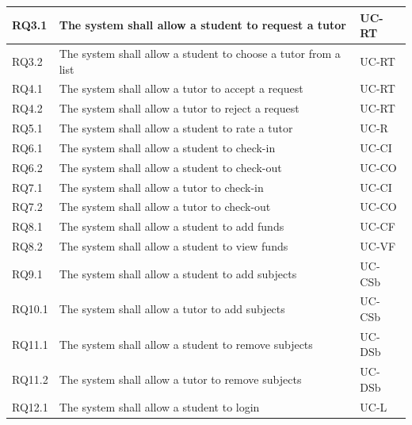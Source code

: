 \documentclass[12pt]{article}
\begin{document}
{\begin{longtable}{| l | p{10cm}| l |}
				RQ3.1 & The system shall allow a student to request a tutor & UC-RT \\ \hline
				RQ3.2 & The system shall allow a student to choose a tutor from a list & UC-RT \\ \hline

				RQ4.1 & The system shall allow a tutor to accept a request & UC-RT \\ \hline
				RQ4.2 & The system shall allow a tutor to reject a request & UC-RT \\ \hline




				RQ5.1 & The system shall allow a student to rate a tutor & UC-R\\ \hline

				RQ6.1 & The system shall allow a student to check-in  & UC-CI \\ \hline
				RQ6.2 & The system shall allow a student to check-out  & UC-CO \\ \hline
				RQ7.1 & The system shall allow a tutor to check-in  & UC-CI \\
\hline
				RQ7.2 & The system shall allow a tutor to check-out  & UC-CO \\ \hline
				RQ8.1 & The system shall allow a student to add funds &UC-CF\\ \hline
				RQ8.2 & The system shall allow a student to view funds &UC-VF\\ \hline
				RQ9.1 & The system shall allow a student to add subjects &UC-CSb\\ \hline
				RQ10.1 & The system shall allow a tutor to add subjects &UC-CSb\\ \hline
				RQ11.1 & The system shall allow a student to remove subjects &UC-DSb\\ \hline
				RQ11.2 & The system shall allow a tutor to remove subjects &UC-DSb\\ \hline
				RQ12.1 & The system shall allow a student to login &UC-L\\ \hline

\end{longtable}}
\end{document}
